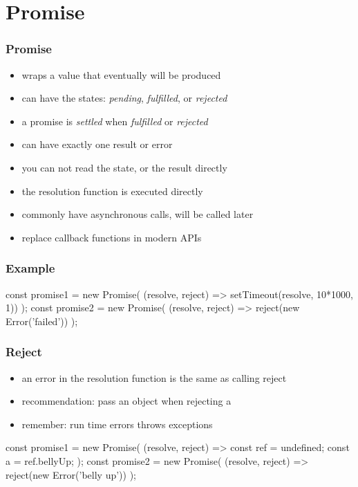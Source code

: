 \section{Promise}
\begin{frame}[fragile] \frametitle{Promise}
\begin{itemize}
  \item wraps a value that eventually will be produced
  \item can have the states: \emph{pending}, \emph{fulfilled}, or \emph{rejected}
  \item a promise is \emph{settled} when  \emph{fulfilled} or \emph{rejected}
  \item can have exactly one result or error
  \item you can not read the state, or the result directly
  \item the resolution function is executed directly
  \item commonly have asynchronous calls,  will be called later
  \item replace callback functions in modern APIs
\end{itemize}
\end{frame}

\begin{frame}[fragile] \frametitle{Example}
\vspace{5mm}
\begin{CodeBox}{}
const promise1 = new Promise(
  (resolve, reject) => setTimeout(resolve, 10*1000, 1))
);
const promise2 = new Promise(
  (resolve, reject) => reject(new Error('failed'))
);
\end{CodeBox}
\end{frame}

\begin{frame}[fragile] \frametitle{Reject}
\begin{itemize}
  \item {} an error in the resolution function is the same as calling reject
  \item recommendation: pass an  object when rejecting a 
  \item remember: run time errors throws exceptions
\end{itemize}
\vspace{5mm}
\begin{CodeBox}{}
const promise1 = new Promise(
  (resolve, reject) => {
    const ref = undefined;
    const a = ref.bellyUp;
});
const promise2 = new Promise(
  (resolve, reject) => reject(new Error('belly up'))
);
\end{CodeBox}
\end{frame}

